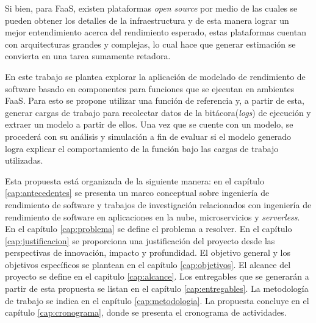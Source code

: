 Si bien, para FaaS, existen plataformas \textit{open source} por medio de las cuales se pueden obtener los detalles de la infraestructura y de esta manera lograr un mejor entendimiento acerca del rendimiento esperado, estas plataformas cuentan con arquitecturas grandes y complejas, lo cual hace que generar estimación se convierta en una tarea sumamente retadora.

En este trabajo se plantea explorar la aplicación de modelado de rendimiento de software basado en componentes para funciones que se ejecutan en ambientes FaaS. Para esto se propone utilizar una función de referencia y, a partir de esta, generar cargas de trabajo para recolectar datos de la bitácora(\textit{logs}) de ejecución y extraer un modelo a partir de ellos. Una vez que se cuente con un modelo, se procederá con su análisis y simulación a fin de evaluar si el modelo generado logra explicar el comportamiento de la función bajo las cargas de trabajo utilizadas.

Esta propuesta está organizada de la siguiente manera: en el capítulo \ref{cap:antecedentes} se presenta un marco conceptual sobre ingeniería de rendimiento de software y trabajos de investigación relacionados con ingeniería de rendimiento de software en aplicaciones en la nube, microservicios y \emph{serverless}. En el capítulo \ref{cap:problema} se define el problema a resolver. En el capítulo \ref{cap:justificacion} se proporciona una justificación del proyecto desde las perspectivas de innovación, impacto y profundidad. El objetivo general y los objetivos específicos se plantean en el capítulo \ref{cap:objetivos}. El alcance del proyecto se define en el capitulo \ref{cap:alcance}. Los entregables que se generarán a partir de esta propuesta se listan en el capítulo \ref{cap:entregables}. La metodología de trabajo se indica en el capítulo \ref{cap:metodologia}. La propuesta concluye en el capítulo \ref{cap:cronograma}, donde se presenta el cronograma de actividades.

